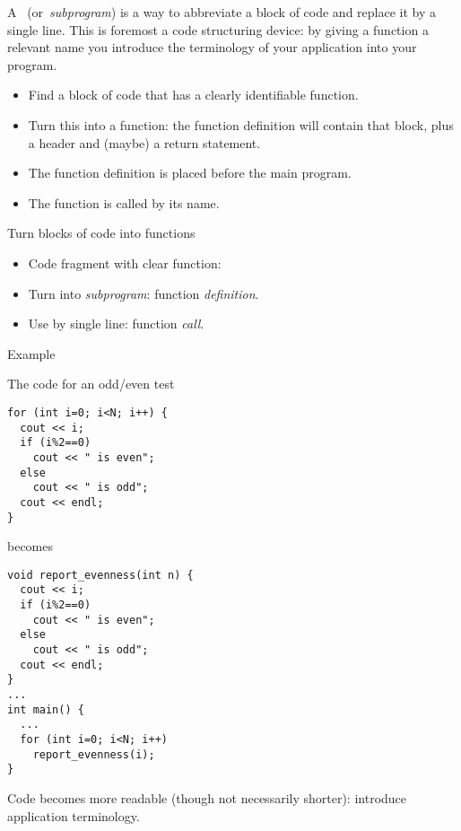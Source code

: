 
A~
(or~\emph{subprogram}) is a way to
abbreviate a block of code and replace it by a single line.
This is foremost a code structuring device: by giving a function a
relevant name you introduce the terminology of your application into
your program.

\begin{itemize}
\item Find a block of code that has a clearly identifiable function.
\item Turn this into a function: the function definition will contain
  that block, plus a header and (maybe) a return statement.
\item The function definition is placed before the main program.
\item The function is called by its name.
\end{itemize}

\begin{slide}{Turn blocks of code into functions}
  \label{sl:function-intro}
  \begin{itemize}
  \item Code fragment with clear function:
  \item Turn into \emph{subprogram}: function \emph{definition}.
  \item Use by single line: function \emph{call}.
  \end{itemize}
\end{slide}

\begin{block}{Example}
  \label{sl:function-example}
  \begin{multicols}{2}
    \small
    The code for an odd/even test
\begin{verbatim}
for (int i=0; i<N; i++) {
  cout << i;
  if (i%2==0)
    cout << " is even";
  else
    cout << " is odd";
  cout << endl;
}
\end{verbatim}
\vfill\hbox{}\columnbreak
becomes
\begin{verbatim}
void report_evenness(int n) {
  cout << i;
  if (i%2==0)
    cout << " is even";
  else
    cout << " is odd";
  cout << endl;
}
...
int main() {
  ...
  for (int i=0; i<N; i++)
    report_evenness(i);
}
\end{verbatim}
  \end{multicols}
Code becomes more readable (though not necessarily shorter): introduce
application terminology.
\end{block}

